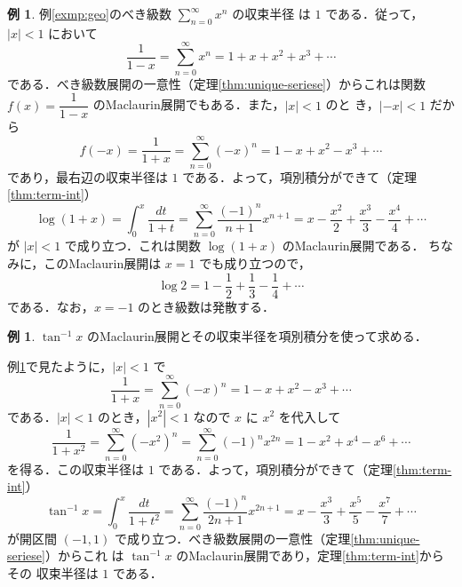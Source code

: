 \documentclass[10pt, uplatex, dvipdfmx]{jsarticle}
\theoremstyle{definition}
\newtheorem{example}[theorem]{例}
\numberwithin{equation}{section}
\newcommand{\ds}{\displaystyle}
\begin{document}
\begin{example}\label{exmp:log-taylor}
  例\ref{exmp:geo}のべき級数 $\ds \sum_{n=0}^{\infty} x^n$ の収束半径
  は $1$ である．従って，$|x|<1$ において
  \[
    \frac{1}{1-x} = \sum_{n=0}^{\infty} x^n = 1 + x + x^2 + x^3 + \cdots 
  \]
  である．べき級数展開の一意性（定理\ref{thm:unique-seriese}）からこれは関数 $
  f(x)=\dfrac{1}{1-x}$ のMaclaurin展開でもある．また，$|x|<1$ のと
  き，$|-x|<1$ だから
  \[
    f(-x) = \frac{1}{1+x} = \sum_{n=0}^{\infty} (-x)^n = 1 -x + x^2 - x^3 + \cdots 
  \]
  であり，最右辺の収束半径は $1$ である．よって，項別積分ができて（定理\ref{thm:term-int}）
  \[
    \log(1+x) = \int_{0}^{x} \frac{dt}{1+t} = \sum_{n=0}^{\infty} \frac{(-1)^n}{n+1} x^{n+1}
    = x - \frac{x^2}{2} + \frac{x^3}{3} - \frac{x^4}{4} + \cdots 
  \]
  が $|x|<1$ で成り立つ．これは関数 $\log(1+x)$ のMaclaurin展開である．
  ちなみに，このMaclaurin展開は $x=1$ でも成り立つので，
  \[
    \log 2 = 1 - \frac{1}{2} + \frac{1}{3} - \frac{1}{4} + \cdots
  \]
  である．なお，$x=-1$ のとき級数は発散する．
\end{example}

\begin{example}\label{exmp:atan-taylor}
  $\tan^{-1}x$ のMaclaurin展開とその収束半径を項別積分を使って求める．

  例\ref{exmp:log-taylor}で見たように，$|x|<1$ で
  \[
    \frac{1}{1+x} = \sum_{n=0}^{\infty} (-x)^n = 1 - x + x^2 - x^3 + \cdots
  \]
  である．$|x| <1$ のとき，$|x^2|<1$ なので $x$ に $x^2$ を代入して
  \[
    \frac{1}{1+x^2} = \sum_{n=0}^{\infty}(-x^2)^n=\sum_{n=0}^{\infty} (-1)^n x^{2n}
    =1 -x^2 + x^4 - x^6 + \cdots 
  \]
  を得る．この収束半径は $1$ である．よって，項別積分ができて（定理\ref{thm:term-int}）
  \[
    \tan^{-1}x = \int_{0}^{x}\frac{dt}{1+t^2} = \sum_{n=0}^{\infty} \frac{(-1)^n}{2n+1}x^{2n+1}
    = x - \frac{x^3}{3} + \frac{x^5}{5} - \frac{x^7}{7} + \cdots
  \]
  が開区間 $(-1,1)$ で成り立つ．べき級数展開の一意性（定理\ref{thm:unique-seriese}）からこれ
  は $\tan^{-1}x$ のMaclaurin展開であり，定理\ref{thm:term-int}からその
  収束半径は $1$ である．
\end{example}
\end{document}
